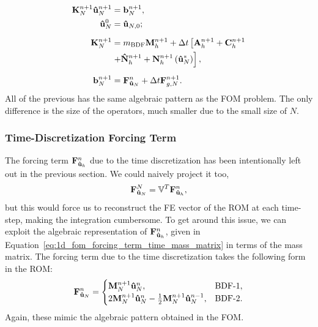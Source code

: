\documentclass[../../thesis.tex]{subfiles}
\newcommand{\rbV}{\ensuremath{\mathbb{V}}}
\newcommand{\rbVT}{\ensuremath{\rbV^T}}
\newcommand{\dt}{\ensuremath{\Delta t}}
\newcommand{\Ah}[1]{\ensuremath{\vb{#1}^{n+1}_h}}
\begin{document}
\begin{subequations}
    \label{eq:1d_rom_linear_system_timestep}
    \begin{align}
        \vb{K}_{N}^{n+1} \vb{\hat{u}}_{N}^{n+1} &= \vb{b}_{N}^{n+1}, 
        \\
        \vb{\hat{u}}_{N}^{0} &= \vb{\hat{u}}_{N,0};
        \\[2mm]
        \vb{K}_{N}^{n+1} &= m_{\text{BDF}} \Ah{M} + \dt \left[\Ah{A} + \Ah{C} \right. 
        \nonumber 
        \\
                        &\left. + \Ah{\hat{N}} + \Ah{N}\left(\vb{\hat{u}}_{N}^{*}\right)\right],
        \\[2mm]
        \vb{b}_{N}^{n+1} &= \vb{F}_{\vb{\hat{u}}_{N}}^{n} + \dt \vb{F}_{g,N}^{n+1}.
    \end{align}
\end{subequations}
All of the previous has the same algebraic pattern as the FOM problem.
The only difference is the size of the operators, much smaller due to the small size of $N$. 

\subsubsection*{Time-Discretization Forcing Term}
The forcing term $\vb{F}_{\vb{\hat{u}}_h}^{n}$ due to the time discretization has been intentionally left out in the previous section.
We could naively project it too, 
\begin{equation}
    \vb{F}_{\vb{\hat{u}}_N}^{N} = \rbVT \vb{F}_{\vb{\hat{u}}_h}^{n},
\end{equation}
but this would force us to reconstruct the FE vector of the ROM at each time-step, making the integration cumbersome.
To get around this issue, we can exploit the algebraic representation of $\vb{F}_{\vb{\hat{u}}_h}^{n}$, 
given in Equation~\eqref{eq:1d_fom_forcing_term_time_mass_matrix} in terms of the mass matrix. 
The forcing term due to the time discretization takes the following form in the ROM:
\begin{equation}
    \vb{F}_{\vb{\hat{u}}_N}^{n} = 
    \begin{cases}
        \vb{M}_{N}^{n+1} \vb{\hat{u}}_{N}^{n},                & \text{BDF-1},
        \\
        2 \vb{M}_{N}^{n+1} \vb{\hat{u}}_{N}^{n}
        - \frac{1}{2}\vb{M}_{N}^{n+1} \vb{\hat{u}}_{N}^{n-1}, & \text{BDF-2}.
    \end{cases}
\end{equation}
Again, these mimic the algebraic pattern obtained in the FOM.
\end{document}
